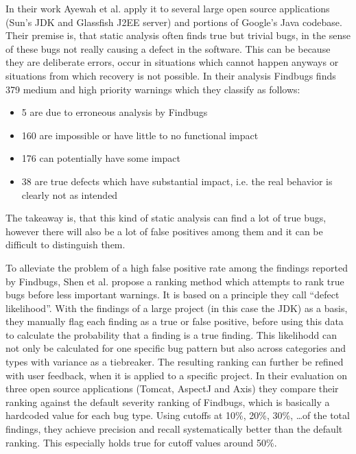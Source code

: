 In their work Ayewah et al. \cite{ayewah2007evaluating} apply it to several large open source applications (Sun's JDK and Glassfish J2EE server) and portions of Google's Java codebase.
Their premise is, that static analysis often finds true but trivial bugs, in the sense of these bugs not really causing a defect in the software.
This can be because they are deliberate errors, occur in situations which cannot happen anyways or situations from which recovery is not possible.
In their analysis Findbugs finds 379 medium and high priority warnings which they classify as follows:
\begin{itemize}
    \item 5 are due to erroneous analysis by Findbugs
    \item 160 are impossible or have little to no functional impact
    \item 176 can potentially have some impact
    \item 38 are true defects which have substantial impact, i.e. the real behavior is clearly not as intended
\end{itemize}
The takeaway is, that this kind of static analysis can find a lot of true bugs, however there will also be a lot of false positives among them and it can be difficult to distinguish them.

To alleviate the problem of a high false positive rate among the findings reported by Findbugs, Shen et al. \cite{shen2011efindbugs} propose a ranking method which attempts to rank true bugs before less important warnings.
It is based on a principle they call ``defect likelihood''.
With the findings of a large project (in this case the JDK) as a basis, they manually flag each finding as a true or false positive, before using this data to calculate the probability that a finding is a true finding.
This likelihodd can not only be calculated for one specific bug pattern but also across categories and types with variance as a tiebreaker.
The resulting ranking can further be refined with user feedback, when it is applied to a specific project.
In their evaluation on three open source applications (Tomcat, AspectJ and Axis) they compare their ranking against the default severity ranking of Findbugs, which is basically a hardcoded value for each bug type.
Using cutoffs at 10\%, 20\%, 30\%, \ldots of the total findings, they achieve precision and recall systematically better than the default ranking.
This especially holds true for cutoff values around 50\%.


